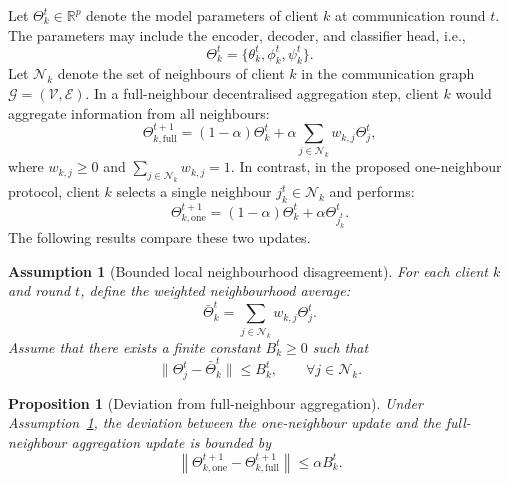 \documentclass[conference]{IEEEtran}
\newtheorem{assumption}{Assumption}
\newtheorem{proposition}{Proposition}
\begin{document}
Let $\Theta_k^t \in \mathbb{R}^p$ denote the model parameters of client $k$ at communication round $t$. The parameters may include the encoder, decoder, and classifier head, i.e.,
\begin{equation}
\Theta_k^t = \{\theta_k^t,\phi_k^t,\psi_k^t\}.
    \label{eq:auto-035}
\end{equation}
Let $\mathcal{N}_k$ denote the set of neighbours of client $k$ in the communication graph $\mathcal{G}=(\mathcal{V},\mathcal{E})$. In a full-neighbour decentralised aggregation step, client $k$ would aggregate information from all neighbours:
\begin{equation}
\Theta_{k,\mathrm{full}}^{t+1}
=
(1-\alpha)\Theta_k^t
+
\alpha
\sum_{j\in\mathcal{N}_k}
w_{k,j}\Theta_j^t,
    \label{eq:auto-036}
\end{equation}
where $w_{k,j}\geq 0$ and $\sum_{j\in\mathcal{N}_k}w_{k,j}=1$. In contrast, in the proposed one-neighbour protocol, client $k$ selects a single neighbour $j_k^t\in\mathcal{N}_k$ and performs:
\begin{equation}
\Theta_{k,\mathrm{one}}^{t+1}
=
(1-\alpha)\Theta_k^t
+
\alpha \Theta_{j_k^t}^t.
    \label{eq:auto-037}
\end{equation}
The following results compare these two updates.

\begin{assumption}[Bounded local neighbourhood disagreement]
\label{ass:bounded_disagreement}
For each client $k$ and round $t$, define the weighted neighbourhood average:
\begin{equation}
\bar{\Theta}_k^t
=
\sum_{j\in\mathcal{N}_k}
w_{k,j}\Theta_j^t.
    \label{eq:auto-038}
\end{equation}
Assume that there exists a finite constant $B_k^t\geq 0$ such that
\begin{equation}
\|\Theta_j^t-\bar{\Theta}_k^t\|
\leq B_k^t,
\qquad
\forall j\in\mathcal{N}_k.
    \label{eq:auto-039}
\end{equation}
\end{assumption}

\begin{proposition}[Deviation from full-neighbour aggregation]
\label{prop:deviation_full}
Under Assumption~\ref{ass:bounded_disagreement}, the deviation between the one-neighbour update and the full-neighbour aggregation update is bounded by
\begin{equation}
\left\|
\Theta_{k,\mathrm{one}}^{t+1}
-
\Theta_{k,\mathrm{full}}^{t+1}
\right\|
\leq
\alpha B_k^t.
    \label{eq:auto-040}
\end{equation}
\end{proposition}
\end{document}
